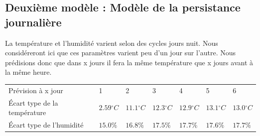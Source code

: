 \documentclass[11pt,a4paper]{article}
\begin{document}
\subsection{Deuxième modèle : Modèle de la persistance journalière}
 La température et l'humidité varient selon des cycles jours nuit. Nous considéreront ici que ces paramètres varient peu d'un jour sur l'autre. Nous prédisions donc que dans x jours il fera la même température que x jours avant à la même heure.
\begin{tabular}{lllllll}\hline
\hline
Prévision à x jour                  &1                         &2                         &3                           &4                         &5                          &6 \\
Écart type de la température& $2.59{}^{\circ}C$& $11.1{}^{\circ}C$& $12.3{}^{\circ}C$& $12.9{}^{\circ}C$& $13.1{}^{\circ}C$& $13.0{}^{\circ}C$\\
Écart type de l'humidité       &  $ 15.0\% $         &  $ 16.8\% $         &  $ 17.5\% $        &  $ 17.7\% $         &  $ 17.6\% $         &  $ 17.7\% $\\
\hline 
\end{tabular}

\end{document}
